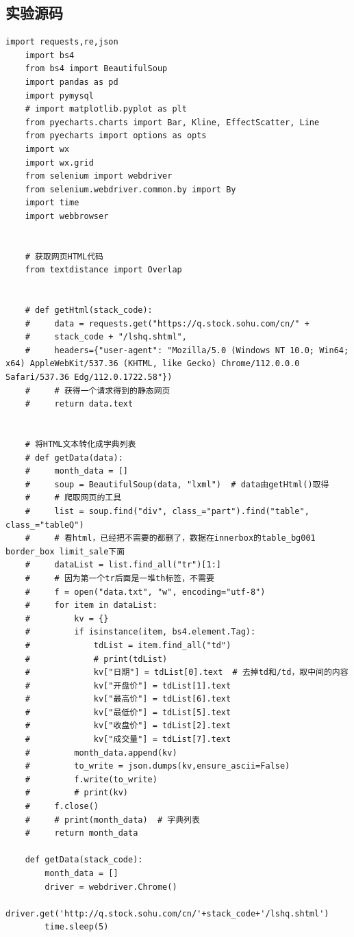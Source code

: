 \documentclass[UTF8,12pt]{article}
\begin{document}
\subsection{实验源码}
\begin{lstlisting}[title=实验源码,frame=shadowbox]
    import requests,re,json
    import bs4
    from bs4 import BeautifulSoup
    import pandas as pd
    import pymysql
    # import matplotlib.pyplot as plt
    from pyecharts.charts import Bar, Kline, EffectScatter, Line
    from pyecharts import options as opts
    import wx
    import wx.grid
    from selenium import webdriver
    from selenium.webdriver.common.by import By
    import time
    import webbrowser
    
    
    # 获取网页HTML代码
    from textdistance import Overlap
    
    
    # def getHtml(stack_code):
    #     data = requests.get("https://q.stock.sohu.com/cn/" +
    #     stack_code + "/lshq.shtml",
    #     headers={"user-agent": "Mozilla/5.0 (Windows NT 10.0; Win64; x64) AppleWebKit/537.36 (KHTML, like Gecko) Chrome/112.0.0.0 Safari/537.36 Edg/112.0.1722.58"})
    #     # 获得一个请求得到的静态网页
    #     return data.text
    
    
    # 将HTML文本转化成字典列表
    # def getData(data):
    #     month_data = []
    #     soup = BeautifulSoup(data, "lxml")  # data由getHtml()取得
    #     # 爬取网页的工具
    #     list = soup.find("div", class_="part").find("table", class_="tableQ")
    #     # 看html，已经把不需要的都删了，数据在innerbox的table_bg001 border_box limit_sale下面
    #     dataList = list.find_all("tr")[1:]
    #     # 因为第一个tr后面是一堆th标签，不需要
    #     f = open("data.txt", "w", encoding="utf-8")
    #     for item in dataList:
    #         kv = {}
    #         if isinstance(item, bs4.element.Tag):
    #             tdList = item.find_all("td")
    #             # print(tdList)
    #             kv["日期"] = tdList[0].text  # 去掉td和/td，取中间的内容
    #             kv["开盘价"] = tdList[1].text
    #             kv["最高价"] = tdList[6].text
    #             kv["最低价"] = tdList[5].text
    #             kv["收盘价"] = tdList[2].text
    #             kv["成交量"] = tdList[7].text
    #         month_data.append(kv)
    #         to_write = json.dumps(kv,ensure_ascii=False)
    #         f.write(to_write)
    #         # print(kv)
    #     f.close()
    #     # print(month_data)  # 字典列表
    #     return month_data
    
    def getData(stack_code):
        month_data = []
        driver = webdriver.Chrome()
        driver.get('http://q.stock.sohu.com/cn/'+stack_code+'/lshq.shtml')
        time.sleep(5)
    

\end{lstlisting}
\end{document}

